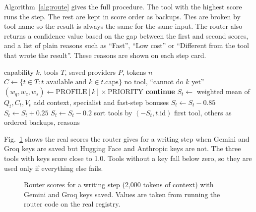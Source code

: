 \documentclass[conference]{IEEEtran}
\begin{document}
Algorithm~\ref{alg:route} gives the full procedure. The tool with the highest score runs the step. The
rest are kept in score order as backups. Ties are broken by tool name so the result is always the same
for the same input. The router also returns a confidence value based on the gap between the first and
second scores, and a list of plain reasons such as ``Fast'', ``Low cost'' or ``Different from the tool
that wrote the result''. These reasons are shown on each step card.

\begin{algorithm}[htbp]
\caption{Per-Step Tool Routing}
\label{alg:route}
\footnotesize
\begin{algorithmic}[1]
\Require capability $k$, tools $T$, saved providers $P$, tokens $n$
\State $C \gets \{t \in T : t \text{ available and } k \in t.\text{caps}\}$
 \Return no tool, ``cannot do $k$ yet'' \EndIf
\State $(w_q,w_c,w_s) \gets \text{PROFILE}[k] \times \text{PRIORITY}$
   \textbf{continue} \EndIf
  \State $S_t \gets$ weighted mean of $Q_t, C_t, V_t$ 
  \State add context, specialist and fast-step bonuses
   $S_t \gets S_t - 0.85$
  \Else{} $S_t \gets S_t + 0.25$ \EndIf
   $S_t \gets S_t - 0.2$ \EndIf
\EndFor
\State sort tools by $(-S_t, t.\text{id})$
\State \Return first tool, others as ordered backups, reasons
\end{algorithmic}
\end{algorithm}

Fig.~\ref{fig:scores} shows the real scores the router gives for a writing step when Gemini and Groq keys
are saved but Hugging Face and Anthropic keys are not. The three tools with keys score close to 1.0.
Tools without a key fall below zero, so they are used only if everything else fails.

\begin{figure}[!t]
\centering
{}
\caption{Router scores for a writing step (2,000 tokens of context) with Gemini and Groq keys saved.
Values are taken from running the router code on the real registry.}
\label{fig:scores}
\end{figure}
\end{document}
